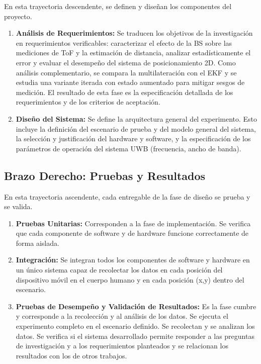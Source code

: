 En esta trayectoria descendente, se definen y diseñan los componentes del proyecto.
\begin{enumerate}
\item \textbf{Análisis de Requerimientos:} Se traducen los objetivos de la investigación en requerimientos verificables: caracterizar el efecto de la BS sobre las mediciones de ToF y la estimación de distancia, analizar estadísticamente el error y evaluar el desempeño del sistema de posicionamiento 2D. Como análisis complementario, se compara la multilateración con el EKF y se estudia una variante iterada con estado aumentado para mitigar sesgos de medición. El resultado de esta fase es la especificación detallada de los requerimientos y de los criterios de aceptación.

\item \textbf{Diseño del Sistema:} Se define la arquitectura general del experimento. Esto incluye la definición del escenario de prueba y del modelo general del sistema, la selección y justificación del hardware y software, y la especificación de los parámetros de operación del sistema UWB (frecuencia, ancho de banda).

\end{enumerate}

\subsection*{Brazo Derecho: Pruebas y Resultados}
En esta trayectoria ascendente, cada entregable de la fase de diseño se prueba y se valida.
\begin{enumerate}

\item \textbf{Pruebas Unitarias:} Corresponden a la fase de implementación. Se verifica que cada componente de software y de hardware funcione correctamente de forma aislada.

\item \textbf{Integración:} Se integran todos los componentes de software y hardware en un único sistema capaz de recolectar los datos en cada posición del dispositivo móvil en el cuerpo humano y en cada posición (x,y) dentro del escenario.

\item \textbf{Pruebas de Desempeño y Validación de Resultados:} Es la fase cumbre y corresponde a la recolección y al análisis de los datos. Se ejecuta el experimento completo en el escenario definido. Se  recolectan y se analizan los datos. Se verifica si el sistema desarrollado permite responder a las preguntas de investigación y a los requerimientos planteados y se relacionan los resultados con los de otros trabajos.

\end{enumerate}

